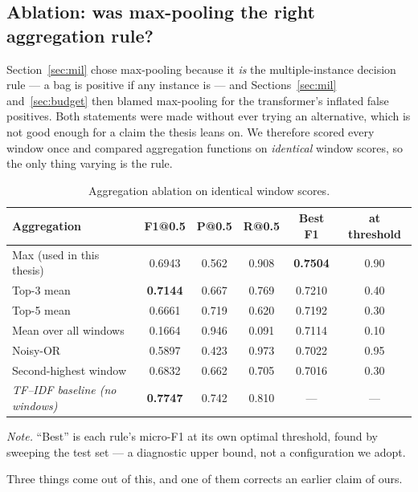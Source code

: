 \subsection{Ablation: was max-pooling the right aggregation rule?}
\label{sec:pooling}
Section~\ref{sec:mil} chose max-pooling because it \emph{is} the multiple-instance decision rule \cite{maron1998mil} --- a bag is positive if any instance is --- and Sections~\ref{sec:mil} and~\ref{sec:budget} then blamed max-pooling for the transformer's inflated false positives. Both statements were made without ever trying an alternative, which is not good enough for a claim the thesis leans on. We therefore scored every window once and compared aggregation functions on \emph{identical} window scores, so the only thing varying is the rule.

\begin{table}[ht]
\centering
\caption{Aggregation ablation on identical window scores.}
\label{tab:pooling}
\small
\begin{tabular}{lccccc}
\toprule
\textbf{Aggregation} & \textbf{F1@0.5} & \textbf{P@0.5} & \textbf{R@0.5} & \textbf{Best F1} & \textbf{at threshold}\\
\midrule
Max (used in this thesis) & 0.6943 & 0.562 & 0.908 & \textbf{0.7504} & 0.90\\
Top-3 mean                & \textbf{0.7144} & 0.667 & 0.769 & 0.7210 & 0.40\\
Top-5 mean                & 0.6661 & 0.719 & 0.620 & 0.7192 & 0.30\\
Mean over all windows     & 0.1664 & 0.946 & 0.091 & 0.7114 & 0.10\\
Noisy-OR                  & 0.5897 & 0.423 & 0.973 & 0.7022 & 0.95\\
Second-highest window     & 0.6832 & 0.662 & 0.705 & 0.7016 & 0.30\\
\midrule
\emph{TF--IDF baseline (no windows)} & \textbf{0.7747} & 0.742 & 0.810 & --- & ---\\
\bottomrule
\end{tabular}

{\footnotesize\singlespacing \emph{Note.} ``Best'' is each rule's micro-F1 at its own optimal threshold, found by sweeping the test set --- a diagnostic upper bound, not a configuration we adopt.\par}
\end{table}

Three things come out of this, and one of them corrects an earlier claim of ours.

